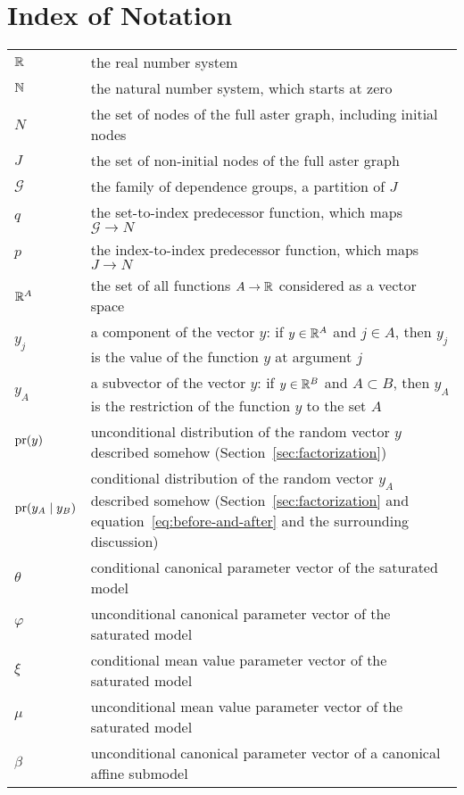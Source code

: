 
\chapter*{Index of Notation}

\noindent
\begin{raggedright}
\noindent
\begin{longtable}{lp{4.4in}}
$\mathbb{R}$ & the real number system \\
$\mathbb{N}$ & the natural number system, which starts at zero \\
$N$ & the set of nodes of the full aster graph, including initial nodes \\
$J$ & the set of non-initial nodes of the full aster graph \\
$\mathcal{G}$ & the family of dependence groups, a partition of $J$ \\
$q$ & the set-to-index predecessor function, which maps $\mathcal{G} \to N$ \\
$p$ & the index-to-index predecessor function, which maps $J \to N$ \\
$\mathbb{R}^A$ & the set of all functions $A \to \mathbb{R}$ considered as
    a vector space \\
$y_j$ & a component of the vector $y$: if $y \in \mathbb{R}^A$ and $j \in A$,
    then $y_j$ is the value of the function $y$ at argument $j$ \\
$y_A$ & a subvector of the vector $y$: if $y \in \mathbb{R}^B$ and $A \subset B$,
    then $y_A$ is the restriction of the function $y$ to the set $A$ \\
$\operatorname{pr}(y)$ & unconditional distribution of the random vector $y$ described
    somehow (Section~\ref{sec:factorization}) \\
$\operatorname{pr}(y_A \mid y_B)$ & conditional distribution of the random vector $y_A$
    described somehow (Section~\ref{sec:factorization}
    and equation~\eqref{eq:before-and-after} and the surrounding discussion) \\
$\theta$ & conditional canonical parameter vector of the saturated model \\
$\varphi$ & unconditional canonical parameter vector of the saturated model \\
$\xi$ & conditional mean value parameter vector of the saturated model \\
$\mu$ & unconditional mean value parameter vector of the saturated model \\
$\beta$ & unconditional canonical parameter vector of a canonical
    affine submodel \\

\end{longtable}
\end{raggedright}

